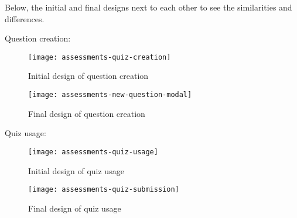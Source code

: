 Below, the initial and final designs next to each other to see the similarities and differences.

\newpage
Question creation:

\begin{figure}[h!]
	\centering
	\texttt{[image: assessments-quiz-creation]}
	\caption{Initial design of question creation}
\end{figure}

\begin{figure}[h!]
	\centering
	\texttt{[image: assessments-new-question-modal]}
	\caption{Final design of question creation}
\end{figure}

\newpage

Quiz usage:

\begin{figure}[h!]
	\centering
	\texttt{[image: assessments-quiz-usage]}
	\caption{Initial design of quiz usage}
\end{figure}

\begin{figure}[h!]
	\centering
	\texttt{[image: assessments-quiz-submission]}
	\caption{Final design of quiz usage}
\end{figure}

\newpage